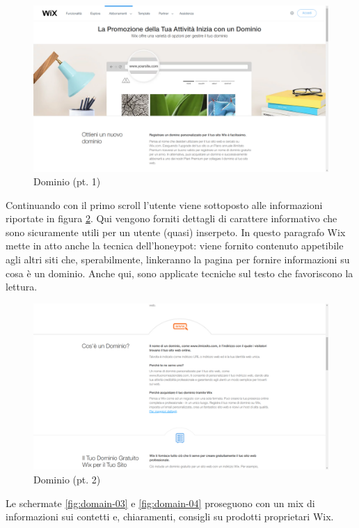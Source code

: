 \documentclass[11pt,a4paper]{article}
\newcommand*{\wix}{Wix}
\begin{document}
\begin{figure}[H]
  \centering
  \includegraphics[width=1\textwidth]{img/domain-01.png}
  \caption{Dominio (pt. 1)}
  \label{fig:domain-01}
\end{figure}

Continuando con il primo scroll l'utente viene sottoposto alle
informazioni riportate in figura \ref{fig:domain-02}. Qui vengono
forniti dettagli di carattere informativo che sono sicuramente utili
per un utente (quasi) inserpeto. In questo paragrafo \wix{} mette in
atto anche la tecnica dell'honeypot: viene fornito contenuto
appetibile agli altri siti che, sperabilmente, linkeranno la pagina
per fornire informazioni su cosa è un dominio. Anche qui, sono
applicate tecniche sul testo che favoriscono la lettura.

\begin{figure}[H]
  \centering
  \includegraphics[width=1\textwidth]{img/domain-02.png}
  \caption{Dominio (pt. 2)}
  \label{fig:domain-02}
\end{figure}

Le schermate \ref{fig:domain-03} e \ref{fig:domain-04} proseguono con
un mix di informazioni sui contetti e, chiaramenti, consigli su
prodotti proprietari \wix{}.
\end{document}
